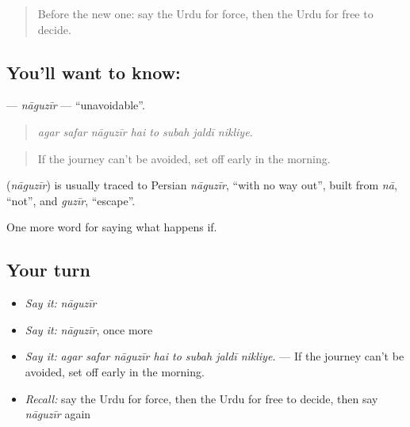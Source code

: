 \begin{quote}
Before the new one: say the Urdu for force, then the Urdu for free to decide.
\end{quote}

\subsection*{You'll want to know: }
\textbf{} — \emph{nāguzīr} — \textquotedblleft{}unavoidable\textquotedblright{}.

\begin{quote}
       
\end{quote}

\begin{quote}
\emph{agar safar nāguzīr hai to subah jaldī nikliye.}
\end{quote}

\begin{quote}
If the journey can't be avoided, set off early in the morning.
\end{quote}

\begin{cousinweb}
\textbf{} (\emph{nāguzīr}) is usually traced to Persian \emph{nāguzīr}, \textquotedblleft{}with no way out\textquotedblright{}, built from \emph{nā}, \textquotedblleft{}not\textquotedblright{}, and \emph{guzīr}, \textquotedblleft{}escape\textquotedblright{}.
\end{cousinweb}

\begin{grammarlens}[title={What you've built}]
One more word for saying what happens if.
\end{grammarlens}

\subsection*{Your turn}
\begin{itemize}
\raggedright
  \item \emph{Say it:} \emph{nāguzīr}
  \item \emph{Say it:} \emph{nāguzīr}, once more
  \item \emph{Say it:} \emph{agar safar nāguzīr hai to subah jaldī nikliye.} — If the journey can't be avoided, set off early in the morning.
  \item \emph{Recall:} say the Urdu for force, then the Urdu for free to decide, then say \emph{nāguzīr} again
\end{itemize}

